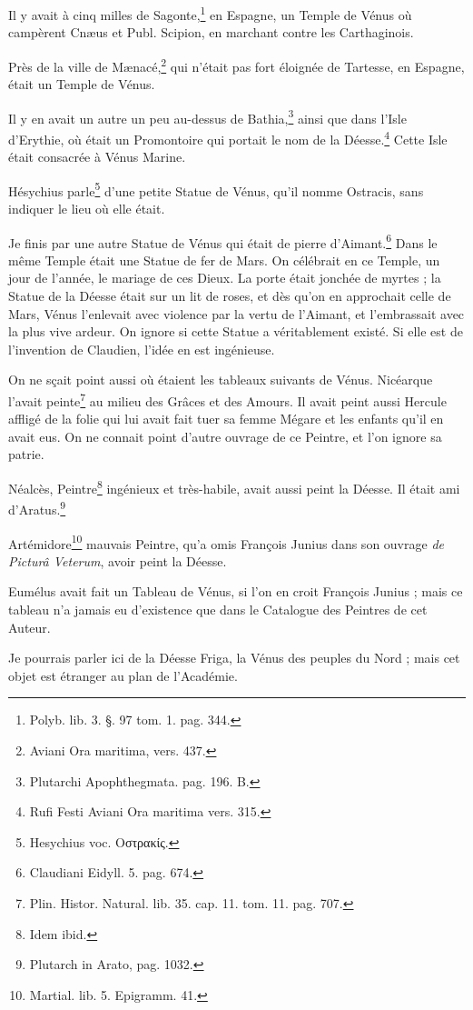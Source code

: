 \documentclass[a4paper, 18pt, oneside]{article}
\begin{document}
Il y avait à cinq milles de Sagonte,\footnote{Polyb. lib. 3. §. 97 tom. 1. pag. 344.} en Espagne, un Temple de Vénus où campèrent Cnæus et Publ. Scipion, en marchant contre les Carthaginois.

Près de la ville de Mænacé,\footnote{Aviani Ora maritima, vers. 437.} qui n'était pas fort éloignée de Tartesse, en Espagne, était un Temple de Vénus.

Il y en avait un autre un peu au-dessus de Bathia,\footnote{Plutarchi Apophthegmata. pag. 196. B.} ainsi que dans l'Isle d'Erythie, où était un Promontoire qui portait le nom de la Déesse.\footnote{Rufi Festi Aviani Ora maritima vers. 315.} Cette Isle était consacrée à Vénus Marine.

Hésychius parle\footnote{Hesychius voc. Οστρακίς.} d'une petite Statue de Vénus, qu'il nomme Ostracis, sans indiquer le lieu où elle était.

Je finis par une autre Statue de Vénus qui était de pierre d'Aimant.\footnote{Claudiani Eidyll. 5. pag. 674.} Dans le même Temple était une Statue de fer de Mars. On célébrait en ce Temple, un jour de l'année, le mariage de ces Dieux. La porte était jonchée de myrtes ; la Statue de la Déesse était sur un lit de roses, et dès qu'on en approchait celle de Mars, Vénus l'enlevait avec violence par la vertu de l'Aimant, et l'embrassait avec la plus vive ardeur. On ignore si cette Statue a véritablement existé. Si elle est de l'invention de Claudien, l'idée en est ingénieuse.

On ne sçait point aussi où étaient les tableaux suivants de Vénus. Nicéarque l'avait peinte\footnote{Plin. Histor. Natural. lib. 35. cap. 11. tom. 11. pag. 707.} au milieu des Grâces et des Amours. Il avait peint aussi Hercule affligé de la folie qui lui avait fait tuer sa femme Mégare et les enfants qu'il en avait eus. On ne connait point d'autre ouvrage de ce Peintre, et l'on ignore sa patrie.

Néalcès, Peintre\footnote{Idem ibid.} ingénieux et très-habile, avait aussi peint la Déesse. Il était ami d'Aratus.\footnote{Plutarch in Arato, pag. 1032.}

Artémidore\footnote{Martial. lib. 5. Epigramm. 41.} mauvais Peintre, qu'a omis François Junius dans son ouvrage \emph{de Picturâ Veterum}, avoir peint la Déesse.

Eumélus avait fait un Tableau de Vénus, si l'on en croit François Junius ; mais ce tableau n'a jamais eu d'existence que dans le Catalogue des Peintres de cet Auteur.

Je pourrais parler ici de la Déesse Friga, la Vénus des peuples du Nord ; mais cet objet est étranger au plan de l'Académie.
\end{document}
